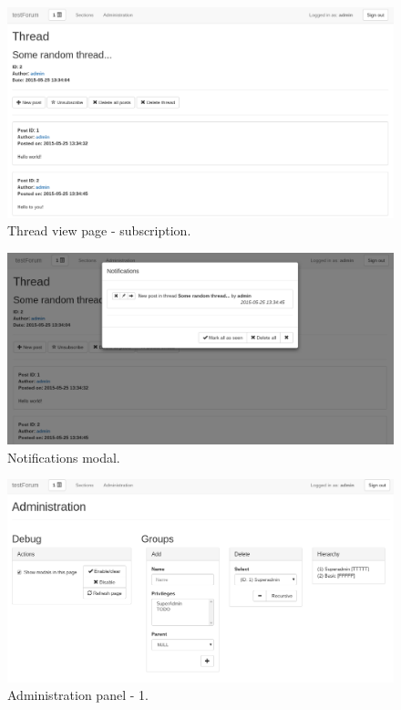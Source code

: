 \documentclass[12pt]{report}
\begin{document}
            \begin{figure}[!htb]
            \caption{Thread view page - subscription.}
            \centering
            \includegraphics[width=1\textwidth]{u/6}
            \end{figure}

            \begin{figure}[!htb]
            \caption{Notifications modal.}
            \centering
            \includegraphics[width=1\textwidth]{u/7}
            \end{figure}

            \begin{figure}[!htb]
            \caption{Administration panel - 1.}
            \centering
            \includegraphics[width=1\textwidth]{u/8}
            \end{figure}
\end{document}
